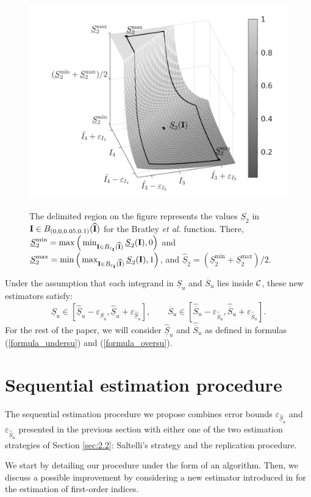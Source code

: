 \begin{figure}[!ht]
\caption{The delimited region on the figure represents the values $\underline{S}_2$ in $\boldsymbol{\mathbf{I}}\in B_{(0,0,0.05,0.1)}(\widehat{\boldsymbol{\mathbf{I}}})$ for the Bratley \textit{et al.} function. There, $\underline{S}_2^{\min}=\max\Big{(}\min_{\boldsymbol{\mathbf{I}}\in B_{\varepsilon_{\boldsymbol{\mathbf{I}}}}(\widehat{\boldsymbol{\mathbf{I}}})} \underline{S}_2(\boldsymbol{\mathbf{I}}),0\Big{)}$ and $\underline{S}_2^{\max}=\min\Big{(}\max_{\boldsymbol{\mathbf{I}}\in B_{\varepsilon_{\boldsymbol{\mathbf{I}}}}(\widehat{\boldsymbol{\mathbf{I}}})} \underline{S}_2(\boldsymbol{\mathbf{I}}),1\Big{)}$, and $\widehat{\underline{S}}_2=(\underline{S}_2^{\min}+\underline{S}_2^{\max})/2$.}
\centering
\includegraphics[width=.5\textwidth]{Fig1.pdf}
\label{fig:1}       %
\end{figure}

Under the assumption that each integrand in $\underline{S}_u$ and $\overline{S}_u$ lies inside $\mathcal{C}$, these new estimators satisfy: \[ \underline{S}_u\in \left[ \widehat{\underline{S}}_u - \varepsilon_{\widehat{\underline{S}}_u}, \widehat{\underline{S}}_u + \varepsilon_{\widehat{\underline{S}}_u} \right], \qquad \overline{S}_u\in \left[ \widehat{\overline{S}}_u - \varepsilon_{\widehat{\overline{S}}_u}, \widehat{\overline{S}}_u + \varepsilon_{\widehat{\overline{S}}_u} \right] .\]
For the rest of the paper, we will consider $\widehat{\underline{S}}_u$ and $\widehat{\overline{S}}_u$   as defined in formulas (\ref{formula_undersu}) and (\ref{formula_oversu}).

\section{Sequential estimation procedure}
\label{sec:4}
The sequential estimation procedure we propose combines error bounds $\varepsilon_{\widehat{\underline{S}}_u}$ and $\varepsilon_{\widehat{\overline{S}}_u}$ presented in the previous section with either one of the two estimation strategies of Section \ref{sec:2.2}: Saltelli's strategy and the replication procedure. 

We start by detailing our procedure under the form of an algorithm. Then, we discuss a possible improvement by considering a new estimator introduced in \cite{Owen} for the estimation of first-order indices.

